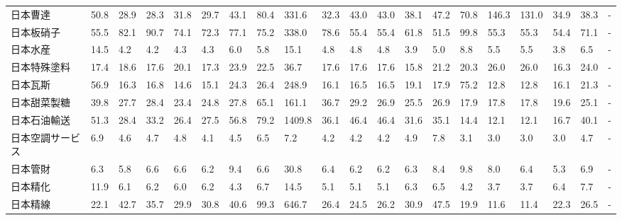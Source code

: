 \begin{tabular}{llllllllllllllllllll}
日本曹達            &   50.8 &   28.9 &      28.3 &      31.8 &       29.7 &    43.1 &    80.4 &    331.6 &    32.3 &    43.0 &   43.0 &   38.1 &    47.2 &    70.8 &   146.3 &  131.0 &   34.9 &    38.3 &      - \\
日本板硝子           &   55.5 &   82.1 &      90.7 &      74.1 &       72.3 &    77.1 &    75.2 &    338.0 &    78.6 &    55.4 &   55.4 &   61.8 &    51.5 &    99.8 &    55.3 &   55.3 &   54.4 &    71.1 &      - \\
日本水産            &   14.5 &    4.2 &       4.2 &       4.3 &        4.3 &     6.0 &     5.8 &     15.1 &     4.8 &     4.8 &    4.8 &    3.9 &     5.0 &     8.8 &     5.5 &    5.5 &    3.8 &     6.5 &      - \\
日本特殊塗料          &   17.4 &   18.6 &      17.6 &      20.1 &       17.3 &    23.9 &    22.5 &     36.7 &    17.6 &    17.6 &   17.6 &   15.8 &    21.2 &    20.3 &    26.0 &   26.0 &   16.3 &    24.0 &      - \\
日本瓦斯            &   56.9 &   16.3 &      16.8 &      14.6 &       15.1 &    24.3 &    26.4 &    248.9 &    16.1 &    16.5 &   16.5 &   19.1 &    17.9 &    75.2 &    12.8 &   12.8 &   16.1 &    21.3 &      - \\
日本甜菜製糖          &   39.8 &   27.7 &      28.4 &      23.4 &       24.8 &    27.8 &    65.1 &    161.1 &    36.7 &    29.2 &   26.9 &   25.5 &    26.9 &    17.9 &    17.8 &   17.8 &   19.6 &    25.1 &      - \\
日本石油輸送          &   51.3 &   28.4 &      33.2 &      26.4 &       27.5 &    56.8 &    79.2 &   1409.8 &    36.1 &    46.4 &   46.4 &   31.6 &    35.1 &    14.4 &    12.1 &   12.1 &   16.7 &    40.1 &      - \\
日本空調サービス        &    6.9 &    4.6 &       4.7 &       4.8 &        4.1 &     4.5 &     6.5 &      7.2 &     4.2 &     4.2 &    4.2 &    4.9 &     7.8 &     3.1 &     3.0 &    3.0 &    3.0 &     4.7 &      - \\
日本管財            &    6.3 &    5.8 &       6.6 &       6.6 &        6.2 &     9.4 &     6.6 &     30.8 &     6.4 &     6.2 &    6.2 &    6.3 &     8.4 &     9.8 &     8.0 &    6.4 &    5.3 &     6.9 &      - \\
日本精化            &   11.9 &    6.1 &       6.2 &       6.0 &        6.2 &     4.3 &     6.7 &     14.5 &     5.1 &     5.1 &    5.1 &    6.3 &     6.5 &     4.2 &     3.7 &    3.7 &    6.4 &     7.7 &      - \\
日本精線            &   22.1 &   42.7 &      35.7 &      29.9 &       30.8 &    40.6 &    99.3 &    646.7 &    26.4 &    24.5 &   26.2 &   30.9 &    47.5 &    19.9 &    11.6 &   11.4 &   22.3 &    26.5 &      - \\

\end{tabular}
